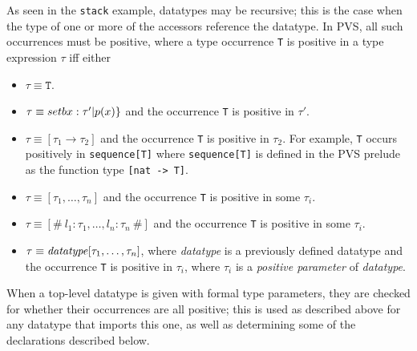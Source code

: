 As seen in the \texttt{stack} example, datatypes may be recursive; this is
the case when the type of one or more of the accessors reference the
datatype.  In PVS, all such occurrences must be positive, where a type
occurrence \texttt{T} is positive in a type expression $\tau$ iff either
\begin{itemize}
\item $\tau\equiv \texttt{T}$.

\item $\tau\equiv \\setb{}x:\tau'|p(x)\}$ and the occurrence \texttt{T} is
positive in $\tau'$.

\item $\tau\equiv [{\tau_1} \rightarrow {\tau_2}]$ and the occurrence
\texttt{T} is positive in $\tau_2$\@.  For example, \texttt{T} occurs
positively in \texttt{sequence[T]} where \texttt{sequence[T]} is defined
in the PVS prelude as the function type \texttt{[nat -> T]}\@.

\item $\tau \equiv [\tau_1,\ldots, \tau_n]$ and the occurrence \texttt{T}
is positive in some $\tau_i$.

\item $\tau\equiv [\#\ l_1 : \tau_1, \ldots, l_n : \tau_n\ \#]$ and the occurrence \texttt{T} is positive in some $\tau_i$\@. 

\item $\tau\equiv \mbox{\emph{datatype}}[\tau_1,\ldots, \tau_n]$, where
\emph{datatype} is a previously defined datatype and the occurrence
\texttt{T} is positive in $\tau_i$, where $\tau_i$ is a \emph{positive
parameter} of \emph{datatype}\@.
\end{itemize}

When a top-level datatype is given with formal type parameters, they are
checked for whether their occurrences are all positive; this is used as
described above for any datatype that imports this one, as well as
determining some of the declarations described below.

